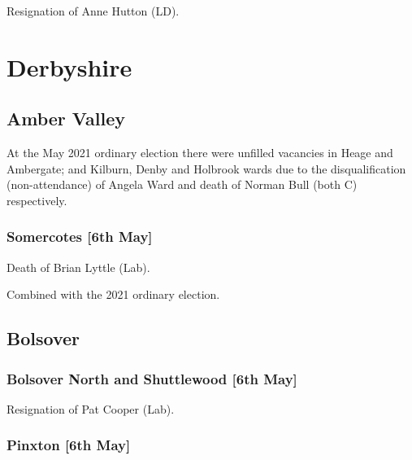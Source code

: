 \documentclass[a4paper,openany]{book}
\begin{document}
\begin{resultsiii}
Resignation of Anne Hutton (LD).

\section{Derbyshire}

\subsection*{Amber Valley}

At the May 2021 ordinary election there were unfilled vacancies in Heage and Ambergate; and Kilburn, Denby and Holbrook wards due to the disqualification (non-attendance) of Angela Ward and death of Norman Bull (both C) respectively.

\subsubsection*{Somercotes \hspace*{\fill}\nolinebreak[1]%
	\enspace\hspace*{\fill}
	[6th May]}


Death of Brian Lyttle (Lab).

Combined with the 2021 ordinary election.

\subsection*{Bolsover}

\subsubsection*{Bolsover North and Shuttlewood \hspace*{\fill}\nolinebreak[1]%
	\enspace\hspace*{\fill}
	[6th May]}


Resignation of Pat Cooper (Lab).

\subsubsection*{Pinxton \hspace*{\fill}\nolinebreak[1]%
	\enspace\hspace*{\fill}
	[6th May]}


\end{resultsiii}
\end{document}
